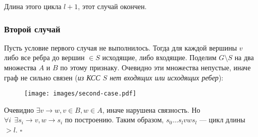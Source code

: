 Длина этого цикла $l+1$, этот случай окончен.

\subsubsection*{Второй случай}

Пусть условие первого случая не выполнилось. Тогда для каждой вершины $v$ либо все ребра до вершин $\in S$ исходящие, либо входящие. Поделим $G\setminus S$ на два множества $A$ и $B$ по этому признаку. Очевидно эти множества непустые, иначе граф не сильно связен (\textit{из КСС $S$ нет входящих или исходящих ребер}):

\begin{figure}[h]
    \texttt{[image: images/second-case.pdf]}
    \centering
\end{figure}

Очевидно $\exists v\to w, v\in B, w\in A$, иначе нарушена связность. Но $\forall i\ \ \exists s_i\to v, w\to s_i$ по построению. Таким образом, $s_0\ldots s_l v w s_l$ --- цикл длины $>l$. $\square$



